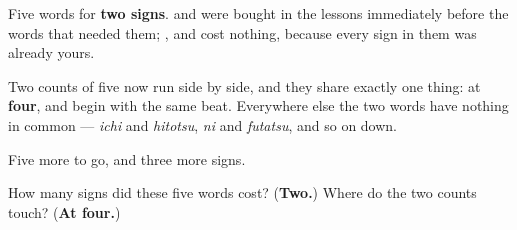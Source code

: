 \begin{grammarlens}[title={What you've built so far}]
Five words for \textbf{two signs}. \textbf{} and \textbf{} were bought in the lessons immediately before the words that needed them; \textbf{}, \textbf{} and \textbf{} cost nothing, because every sign in them was already yours.

Two counts of five now run side by side, and they share exactly one thing: at \textbf{four}, \textbf{} and \textbf{} begin with the same beat. Everywhere else the two words have nothing in common — \emph{ichi} and \emph{hitotsu}, \emph{ni} and \emph{futatsu}, and so on down.

Five more to go, and three more signs.
\end{grammarlens}

\begin{tcolorbox}[breakable,colback=teal!4,colframe=teal!35!black,title={Before you move on}]
How many signs did these five words cost? (\textbf{Two.}) Where do the two counts touch? (\textbf{At four.})
\end{tcolorbox}
